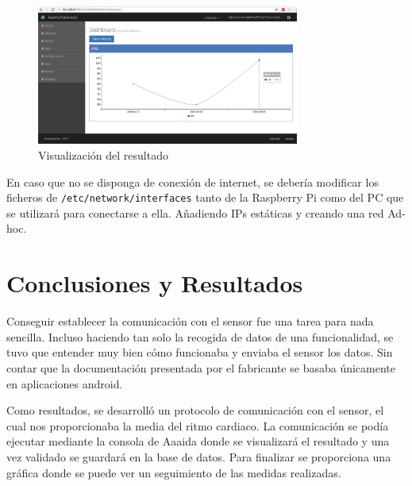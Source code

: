 \begin{figure}[htb]
\begin{center}
\includegraphics[width=0.77\textwidth]{./setup/conect2}
\caption{Visualización del resultado}
\end{center}
\end{figure}

En caso que no se disponga de conexión de internet, se debería modificar los ficheros de \texttt{/etc/network/interfaces} tanto de la Raspberry Pi como del PC que se utilizará para conectarse a ella. Añadiendo IPs estáticas y creando una red Ad-hoc. 


\section{Conclusiones y Resultados}

Conseguir establecer la comunicación con el sensor fue una tarea para nada sencilla. Incluso haciendo tan solo la recogida de datos de una funcionalidad, se tuvo que entender muy bien cómo funcionaba y enviaba el sensor los datos. Sin contar que la documentación presentada por el fabricante se basaba únicamente en aplicaciones android. 

Como resultados, se desarrolló un protocolo de comunicación con el sensor, el cual nos proporcionaba la media  del ritmo cardiaco. La comunicación se podía ejecutar mediante la consola de Aaaida donde se visualizará el resultado y una vez validado se guardará en la base de datos. Para finalizar se proporciona una gráfica donde se puede ver un seguimiento de las medidas realizadas. 


